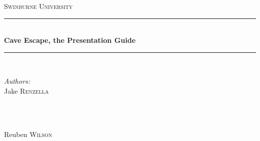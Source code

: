 \documentclass[12pt]{article}
\begin{document}
\begin{titlepage}

\newcommand{\HRule}{\rule{\linewidth}{0.5mm}} %

\center %


\textsc{\LARGE Swinburne University}\\[1.5cm] %


\HRule \\[0.4cm]
{ \huge \bfseries Cave Escape, the Presentation Guide}\\[0.4cm] %
\HRule \\[1.5cm]


\begin{minipage}{0.4\textwidth}
\begin{flushleft} \large
\emph{Authors:}\\
Jake \textsc{Renzella} %
\end{flushleft}
\end{minipage}
~
\begin{minipage}{0.4\textwidth}
\begin{flushright} \large
\emph{ } \\
Reuben \textsc{Wilson} %
\end{flushright}
\end{minipage}\\[4cm]




\end{titlepage}
\end{document}
